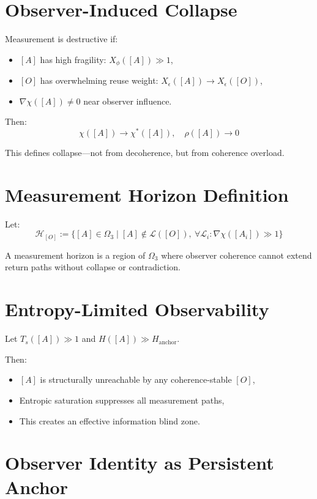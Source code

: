 \section{Observer-Induced Collapse} \label{sec:observer-collapse}

Measurement is destructive if:
\begin{itemize}
  \item $[A]$ has high fragility: $X_\phi([A]) \gg 1$,
  \item $[O]$ has overwhelming reuse weight: $X_\epsilon([A]) \to X_\epsilon([O])$,
  \item $\nabla\chi([A]) \ne 0$ near observer influence.
\end{itemize}

Then:
\[
\chi([A]) \to \chi^*([A]),\quad \rho([A]) \to 0
\]

This defines collapse—not from decoherence, but from coherence overload.

\section{Measurement Horizon Definition} \label{sec:horizon-def}

Let:
\[
\mathcal{H}_{[O]} := \{ [A] \in \Omega_3 \mid [A] \not\in \mathcal{L}([O]),\ \forall \mathcal{L}_i: \nabla\chi([A_i]) \gg 1 \}
\]

\begin{definition}
A measurement horizon is a region of $\Omega_3$ where observer coherence cannot extend return paths without collapse or contradiction.
\end{definition}

\section{Entropy-Limited Observability} \label{sec:entropy-limit}

Let $T_s([A]) \gg 1$ and $H([A]) \gg H_{\text{anchor}}$.

Then:
\begin{itemize}
  \item $[A]$ is structurally unreachable by any coherence-stable $[O]$,
  \item Entropic saturation suppresses all measurement paths,
  \item This creates an effective information blind zone.
\end{itemize}

\section{Observer Identity as Persistent Anchor} \label{sec:observer-anchor}

